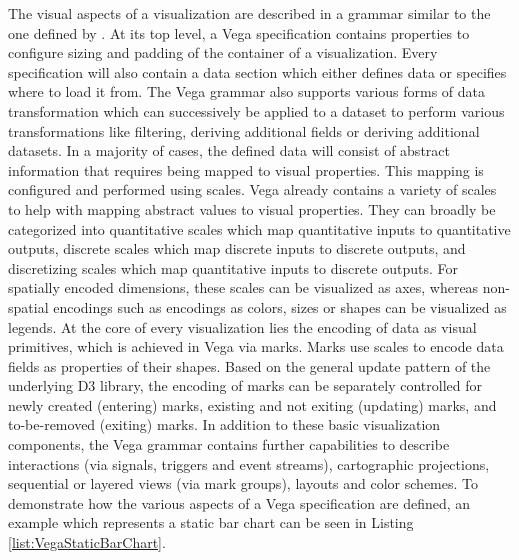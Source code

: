 The visual aspects of a visualization are described in a grammar similar to the one defined by \cite{GrammarOfGraphics}.
At its top level, a Vega specification contains properties to configure sizing and padding of the container of a visualization.
Every specification will also contain a data section which either defines data or specifies where to load it from.
The Vega grammar also supports various forms of data transformation which can successively be applied to a dataset to perform various transformations like filtering, deriving additional fields or deriving additional datasets.
In a majority of cases, the defined data will consist of abstract information that requires being mapped to visual properties.
This mapping is configured and performed using scales.
Vega already contains a variety of scales to help with mapping abstract values to visual properties.
They can broadly be categorized into quantitative scales which map quantitative inputs to quantitative outputs, discrete scales which map discrete inputs to discrete outputs, and discretizing scales which map quantitative inputs to discrete outputs.
For spatially encoded dimensions, these scales can be visualized as axes, whereas non-spatial encodings such as encodings as colors, sizes or shapes can be visualized as legends.
At the core of every visualization lies the encoding of data as visual primitives, which is achieved in Vega via marks.
Marks use scales to encode data fields as properties of their shapes.
Based on the general update pattern of the underlying D3 library, the encoding of marks can be separately controlled for newly created (entering) marks, existing and not exiting (updating) marks, and to-be-removed (exiting) marks.
In addition to these basic visualization components, the Vega grammar contains further capabilities to describe interactions (via signals, triggers and event streams), cartographic projections, sequential or layered views (via mark groups), layouts and color schemes.
To demonstrate how the various aspects of a Vega specification are defined, an example which represents a static bar chart can be seen in Listing \ref{list:VegaStaticBarChart}.

\begin{samepage}
 
    The Vega specification of a static bar chart.
    Demonstrates the principle of data, scales, axes and marks.
  },
]{listings/vega-static-bar-chart.json}
\end{samepage}

